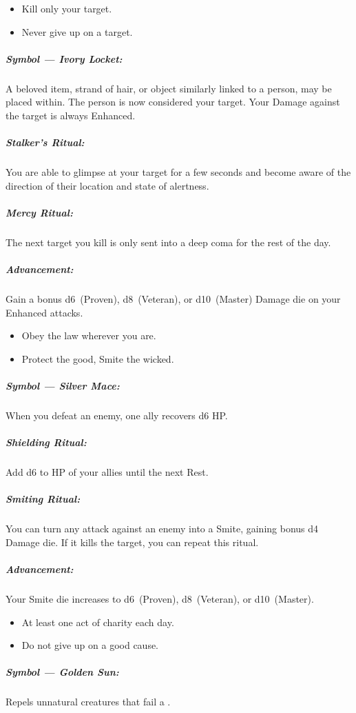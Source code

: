 \documentclass[itdr]{subfiles}
\begin{document}
\vfill

{\em\begin{itemize}
		\item Kill only your target.
		\item Never give up on a target.
\end{itemize}}

\subparagraph{Symbol --- Ivory Locket:} A beloved item, strand of hair, or object similarly linked to a person, may be placed within. The person is now considered your target. Your Damage against the target is always Enhanced.

\subparagraph{Stalker's Ritual:} You are able to glimpse at your target for a few seconds and become aware of the direction of their location and state of alertness.

\subparagraph{Mercy Ritual:} The next target you kill is only sent into a deep coma for the rest of the day.

\subparagraph{Advancement:} Gain a bonus d6~(Proven), d8~(Veteran), or d10~(Master) Damage die on your Enhanced attacks.

\vfill

{\em\begin{itemize}
		\item Obey the law wherever you are.
		\item Protect the good, Smite the wicked.
\end{itemize}}

\subparagraph{Symbol --- Silver Mace:} When you defeat an enemy, one ally recovers d6 HP.

\subparagraph{Shielding Ritual:} Add d6 to HP of your allies until the next Rest.

\subparagraph{Smiting Ritual:} You can turn any attack against an enemy into a Smite, gaining bonus d4 Damage die. If it kills the target, you can repeat this ritual.

\subparagraph{Advancement:} Your Smite die increases to d6~(Proven), d8~(Veteran), or d10~(Master).

\vfill

{\em\begin{itemize}
		\item At least one act of charity each day.
		\item Do not give up on a good cause.
\end{itemize}}

\subparagraph{Symbol --- Golden Sun:} Repels unnatural creatures that fail a .
\end{document}
